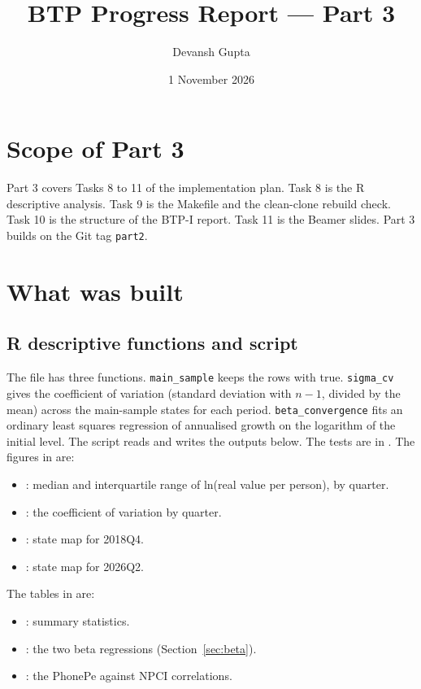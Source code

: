 \documentclass[11pt,a4paper]{article}
\title{BTP Progress Report --- Part 3}
\author{Devansh Gupta}
\date{1 November 2026}
\begin{document}
\maketitle

\section{Scope of Part 3}
Part 3 covers Tasks 8 to 11 of the implementation plan. Task 8 is the R descriptive analysis. Task 9 is the Makefile and the clean-clone rebuild check. Task 10 is the structure of the BTP-I report. Task 11 is the Beamer slides.
Part 3 builds on the Git tag \texttt{part2}.

\section{What was built}
\subsection{R descriptive functions and script}
The file  has three functions. \texttt{main\_sample} keeps the rows with  true. \texttt{sigma\_cv} gives the coefficient of variation (standard deviation with $n-1$, divided by the mean) across the main-sample states for each period. \texttt{beta\_convergence} fits an ordinary least squares regression of annualised growth on the logarithm of the initial level.
The script  reads  and writes the outputs below. The tests are in .
The figures in  are:
\begin{itemize}
\item {}: median and interquartile range of ln(real value per person), by quarter.
\item {}: the coefficient of variation by quarter.
\item {}: state map for 2018Q4.
\item {}: state map for 2026Q2.
\end{itemize}
The tables in  are:
\begin{itemize}
\item {}: summary statistics.
\item {}: the two beta regressions (Section~\ref{sec:beta}).
\item {}: the PhonePe against NPCI correlations.
\end{itemize}
\end{document}
